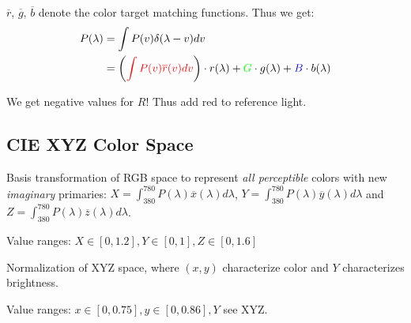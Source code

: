 \(\overline{r}\), \(\overline{g}\), \(\overline{b}\) denote the color target matching functions. Thus we get:
\begin{align*}
  P(\lambda) &= \int P(v)\delta(\lambda - v)dv \\
  &= \left({\color{red}\int P(v)\overline{r}(v)dv}\right)\cdot r(\lambda) + {\color{green}G} \cdot g(\lambda) + {\color{blue}B} \cdot b(\lambda)
\end{align*}

We get negative values for \(R\)! Thus add red to reference light.

\subsection{CIE XYZ Color Space}
Basis transformation of RGB space to represent \textit{all perceptible} colors with new \textit{imaginary} primaries:
\(X = \int_{380}^{780} P(\lambda)\overline{x}(\lambda) d\lambda\), \(Y = \int_{380}^{780} P(\lambda)\overline{y}(\lambda) d\lambda\) and \(Z = \int_{380}^{780} P(\lambda)\overline{z}(\lambda) d\lambda\).

\begin{theorem}
  Value ranges: \(X \in [0, 1.2], Y \in [0, 1], Z \in [0, 1.6]\)
\end{theorem}

\begin{definition}
  Normalization of XYZ space, where \((x, y)\) characterize color and \(Y\) characterizes brightness.
\end{definition}

\begin{theorem}
  Value ranges: \(x \in [0, 0.75], y \in [0, 0.86], Y\) see XYZ.
\end{theorem}

